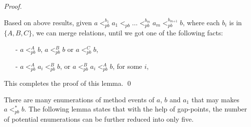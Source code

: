 \begin {proof}
\begin{itemize}
\end{itemize}

Based on above results, given $a <_{\textit{pb}}^{b_1} a_1 <_{\textit{pb}} \ldots <_{\textit{pb}}^{b_m} a_m <_{\textit{pb}}^{b_{\textit{m+1}}} b$, where each $b_i$ is in $\{ A,B,C \}$, we can merge relations, until we got one of the following facts:

\begin{itemize}
\setlength{\itemsep}{0.5pt}
\item[-] $a <_{\textit{pb}}^A b$, $a <_{\textit{pb}}^B b$ or $a <_{\textit{pb}}^C b$,

\item[-] $a <_{\textit{pb}}^A a_i <_{\textit{pb}}^B b$, or $a <_{\textit{pb}}^B a_i <_{\textit{pb}}^A b$, for some $i$,
\end{itemize}

This completes the proof of this lemma. \qed
\end {proof}

There are many enumerations of method events of $a$, $b$ and $a_1$ that may makes $a <_{\textit{pb}}^* b$. The following lemma states that with the help of gap-points, the number of potential enumerations can be further reduced into only five.


